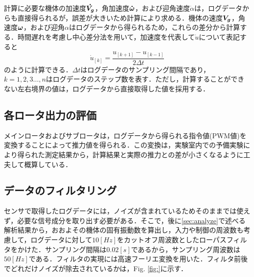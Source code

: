 計算に必要な機体の加速度$\mbox{\boldmath $\dot{V_g}$}$，角加速度$\mbox{\boldmath $\dot{\omega}$}$，および迎角速度$\dot{\alpha}$は，ログデータからも直接得られるが，誤差が大きいため計算により求める．機体の速度$\mbox{\boldmath $V_g$}$，角速度$\mbox{\boldmath $\omega$}$，および迎角$\alpha$はログデータから得られるため，これらの差分から計算する．時間遅れを考慮し中心差分法を用いて，加速度を代表して$\dot{u}$について表記すると
\begin{equation}
  \dot{u}_{[k]} = \dfrac{u_{[k+1]}-u_{[k-1]}}{2\Delta t}
\end{equation}
のように計算できる．$\Delta t$はログデータのサンプリング間隔であり，$k=1,2,3\hdots,n$はログデータのステップ数を表す．ただし，計算することができない左右境界の値は，ログデータから直接取得した値を採用する．

\subsection{各ロータ出力の評価}

メインロータおよびサブロータは，ログデータから得られる指令値(PWM値)を変換することによって推力値を得られる．この変換は，実験室内での予備実験により得られた測定結果から，計算結果と実際の推力との差が小さくなるように工夫して概算している．\cite{}

\subsection{データのフィルタリング}
\label{sec:filter}

センサで取得したログデータには，ノイズが含まれているためそのままでは使えず，必要な信号成分を取り出す必要がある．そこで，後に\ref{sec:analyze}で述べる解析結果から，おおよその機体の固有振動数を算出し，入力や制御の周波数も考慮して，ログデータに対して$10[Hz]$をカットオフ周波数としたローパスフィルタをかけた．サンプリング間隔は$0.02[s]$であるから，サンプリング周波数は$50[Hz]$である．フィルタの実現には高速フーリエ変換を用いた．フィルタ前後でどれだけノイズが除去されているかは，Fig. \ref{fig:}に示す．






